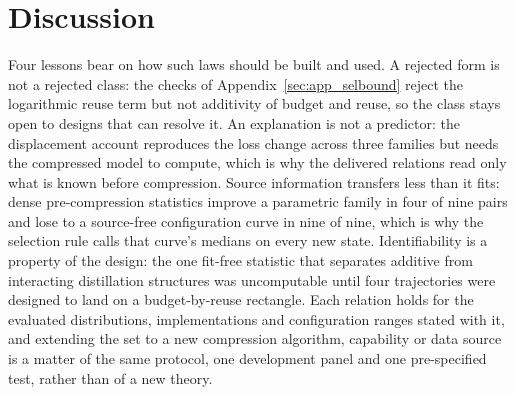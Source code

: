 \section{Discussion}
\label{sec:app_learned}

Four lessons bear on how such laws should be built and used. A
rejected form is not a rejected class: the checks of Appendix~\ref{sec:app_selbound} reject the
logarithmic reuse term but not additivity of budget and reuse, so the class stays open to designs
that can resolve it.
An explanation is not a predictor: the displacement account reproduces the loss change across
three families but needs the compressed model to compute, which is why the delivered relations
read only what is known before compression. Source information transfers less than it fits: dense
pre-compression statistics improve a parametric family in four of nine pairs and lose to a
source-free configuration curve in nine of nine, which is why the selection rule calls that
curve's medians on every new state. Identifiability is a property of the design: the one fit-free
statistic that separates additive from interacting distillation structures was uncomputable until
four trajectories were designed to land on a budget-by-reuse rectangle. Each relation holds for the
evaluated distributions, implementations and configuration ranges stated with it, and extending the
set to a new compression algorithm, capability or data source is a matter of the same protocol, one
development panel and one pre-specified test, rather than of a new theory.

\section{\texorpdfstring{}{Additions for the Revision}}
\label{sec:app_revision}



